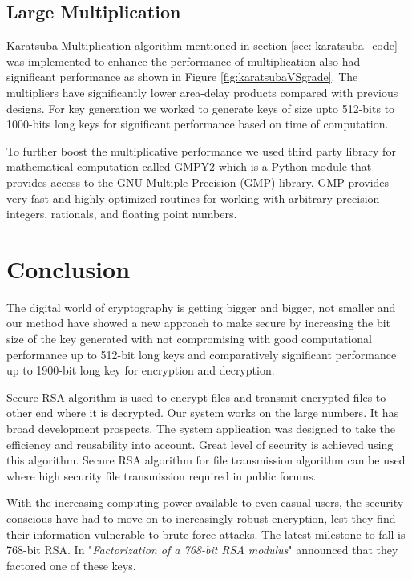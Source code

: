 \documentclass[conference]{IEEEtran}
\begin{document}
\subsection{{\large Large Multiplication}}
Karatsuba Multiplication\cite{karatsuba_multiplication} algorithm mentioned in section \ref{sec: karatsuba_code} was implemented to enhance the performance of multiplication also had significant performance as shown in Figure \ref{fig:karatsubaVSgrade}. The multipliers have significantly lower area-delay products compared with previous designs\cite{karatsuba_multiplication}. For key generation we worked to generate keys of size upto 512-bits to 1000-bits long keys for significant performance based on time of computation.

To further boost the multiplicative performance we used third party library for mathematical computation called GMPY2\cite{gmpy2} which is a Python module that provides access to the GNU Multiple Precision (GMP) library. GMP provides very fast and highly optimized routines for working with arbitrary precision integers, rationals, and floating point numbers.


\section{{\LARGE Conclusion}}
The digital world of cryptography is getting bigger and bigger, not smaller and our method have showed a new approach to make secure by increasing the bit size of the key generated with not compromising with good computational performance up to 512-bit long keys and comparatively significant performance up to 1900-bit long key for encryption and decryption. 


Secure RSA algorithm is used to encrypt files and transmit encrypted files to other end where it is decrypted. Our system works on the large numbers. It has broad development prospects. The system application was designed to take the efficiency and reusability into account. Great level of security is achieved using this algorithm. Secure RSA algorithm for file transmission algorithm can be used where high security file transmission required in public forums.


With the increasing computing power available to even casual users, the security conscious have had to move on to increasingly robust encryption, lest they find their information vulnerable to brute-force attacks. The latest milestone to fall is 768-bit RSA. In "\emph{Factorization of a 768-bit RSA modulus}"\cite{768_key} announced that they factored one of these keys. 
\end{document}
